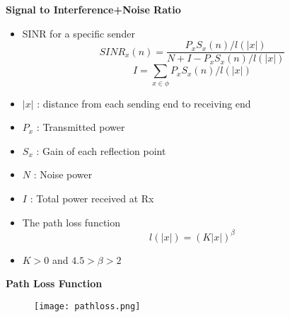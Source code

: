 \documentclass[9pt, dvipsnames]{beamer} %
\begin{document}
   \begin{frame}{\textbf {Signal to Interference+Noise Ratio}}
             \begin{itemize}
              \item SINR for a specific sender
              \begin{equation}
                  SINR_x(n)=\frac{P_x S_x(n)/l(|x|)}{N+I-P_xS_x(n)/l(|x|)}
              \end{equation}
              \begin{equation}
                  I=\sum_{x\in\phi}P_xS_x(n)/l(|x|)
              \end{equation}
               \item $|x|$ : distance from each sending end to receiving end
               \item $P_x$ : Transmitted power
               \item $S_x$ : Gain of each reflection point
               \item $N$ : Noise power
               \item $I$ : Total power received at Rx
               \item The path loss function 
               \begin{equation}
                   l(|x|)=(K|x|)^\beta
               \end{equation}
               \item $K>0$ and $4.5>\beta>2$
               
              
             \end{itemize}
   \end{frame}
 
   \begin{frame}{\textbf {Path Loss Function}}
          
             \begin{figure}
               \texttt{[image: pathloss.png]}
             \end{figure}
            
          
   \end{frame}
\end{document}
